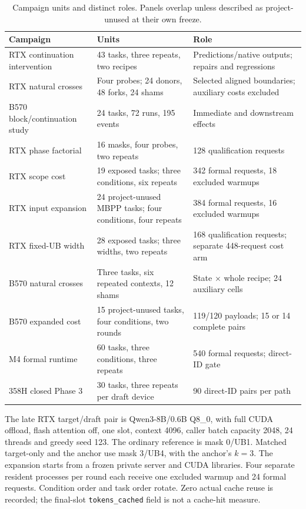 \begin{table}[ht]\centering\small
\caption{Campaign units and distinct roles. Panels overlap unless described as project-unused at their own freeze.}
\label{tab:study_units}
\begin{tabularx}{\linewidth}{@{}p{.30\linewidth}p{.25\linewidth}X@{}}\toprule
Campaign & Units & Role\\\midrule
RTX continuation intervention & 43 tasks, three repeats, two recipes & Predictions/native outputs; repairs and regressions\\
RTX natural crosses & Four probes; 24 donors, 48 forks, 24 shams & Selected aligned boundaries; auxiliary costs excluded\\
B570 block/continuation study & 24 tasks, 72 runs, 195 events & Immediate and downstream effects\\
RTX phase factorial & 16 masks, four probes, two repeats & 128 qualification requests\\
RTX scope cost & 19 exposed tasks; three conditions, six repeats & 342 formal requests, 18 excluded warmups\\
RTX input expansion & 24 project-unused MBPP tasks; four conditions, four repeats & 384 formal requests, 16 excluded warmups\\
RTX fixed-UB width & 28 exposed tasks; three widths, two repeats & 168 qualification requests; separate 448-request cost arm\\
B570 natural crosses & Three tasks, six repeated contexts, 12 shams & State $\times$ whole recipe; 24 auxiliary cells\\
B570 expanded cost & 15 project-unused tasks, four conditions, two rounds & 119/120 payloads; 15 or 14 complete pairs\\
M4 formal runtime & 60 tasks, three conditions, three repeats & 540 formal requests; direct-ID gate\\
358H closed Phase 3 & 30 tasks, three repeats per draft device & 90 direct-ID pairs per path\\\bottomrule
\end{tabularx}
\end{table}

The late RTX target/draft pair is Qwen3-8B/0.6B Q8\_0, with full CUDA offload, flash attention off, one slot, context 4096, caller batch capacity 2048, 24 threads and greedy seed 123. The ordinary reference is mask 0/UB1. Matched target-only and the anchor use mask 3/UB4, with the anchor's $k=3$. The expansion starts from a frozen private server and CUDA libraries. Four separate resident processes per round each receive one excluded warmup and 24 formal requests. Condition order and task order rotate. Zero actual cache reuse is recorded; the final-slot \texttt{tokens\_cached} field is not a cache-hit measure.

